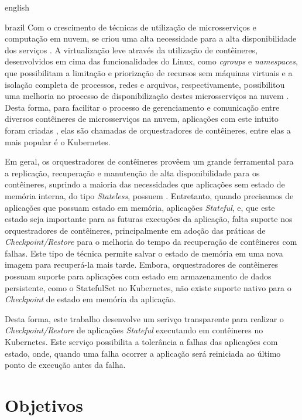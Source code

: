 \begin{otherlanguage*}{english}
\begin{otherlanguage*}{brazil}
Com o crescimento de técnicas de utilização de microsserviços e computação em
nuvem, se criou uma alta necessidade para a alta disponibilidade dos serviços
\cite{vayghan2021kubernetes}. A virtualização leve através da utilização de
contêineres, desenvolvidos em cima das funcionalidades do Linux, como \textit{cgroups}
e \textit{namespaces}, que possibilitam a limitação e priorização de recursos sem máquinas
virtuais e a isolação completa de processos, redes e arquivos, respectivamente,
possibilitou uma melhoria no processo de disponibilização destes microsserviços
na nuvem \cite{laadan2010linux}. Desta forma, para facilitar o processo de
gerenciamento e comunicação entre diversos contêineres de microsserviços na
nuvem, aplicações com este intuito foram criadas \cite{vayghan2021kubernetes},
elas são chamadas de orquestradores de contêineres, entre elas a mais popular é
o Kubernetes\cite{kubernetes}.

Em geral, os orquestradores de contêineres provêem um grande ferramental para a
replicação, recuperação e manutenção de alta disponibilidade para os contêineres,
suprindo a maioria das necessidades que aplicações sem estado de memória interna,
do tipo \textit{Stateless}, possuem \cite{vayghan2021kubernetes}. Entretanto,
quando precisamos de aplicações que possuam estado em memória, aplicações
\textit{Stateful}, e, que este estado seja importante para as futuras execuções
da aplicação, falta suporte nos orquestradores de contêineres, principalmente em
adoção das práticas de \textit{Checkpoint/Restore} \cite{muller2022architecture}
para o melhoria do tempo da recuperação de contêineres com falhas. Este tipo de
técnica permite salvar o estado de memória em uma nova imagem para recuperá-la
mais tarde. Embora, orquestradores de contêineres possuam suporte para aplicações
com estado em armazenamento de dados persistente, como o StatefulSet no Kubernetes,
não existe suporte nativo para o \textit{Checkpoint} de estado em memória da
aplicação\cite{tran2022proactive}.

Desta forma, este trabalho desenvolve um serivço transparente para realizar o
\textit{Checkpoint/Restore} de aplicações \textit{Stateful} executando em
contêineres no Kubernetes. Este serviço possibilita a tolerância a falhas
das aplicações com estado, onde, quando uma falha ocorrer a aplicação será reiniciada
ao último ponto de execução antes da falha.

\section{Objetivos}


\end{otherlanguage*}
\end{otherlanguage*}

